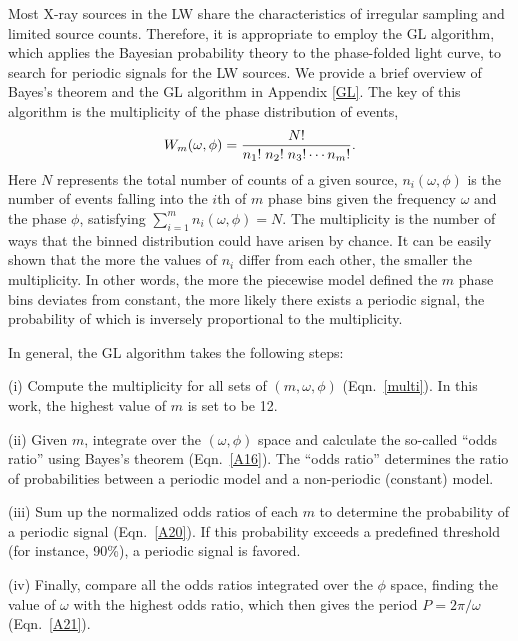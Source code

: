 \documentclass[fleqn,usenatbib]{mnras}
\begin{document}
Most X-ray sources in the LW share the characteristics of irregular sampling and limited source counts. 
Therefore, it is appropriate to employ the GL algorithm, which applies the Bayesian probability theory to the phase-folded light curve, to search for periodic signals for the LW sources. We provide a brief overview of Bayes's theorem and the GL algorithm in Appendix \ref{GL}. 
The key of this algorithm is the multiplicity of the phase distribution of events,
\begin{equation}\label{multi}
W_m(\omega, \phi)={{N!}\over{n_1!\; n_2!\; n_3!\cdots {n_m}!}}.
\end{equation}
Here $N$ represents the total number of counts of a given source, 
$n_i(\omega, \phi)$ is the number of events falling into the $i$th of $m$ phase bins given the frequency $\omega$ and the phase $\phi$, satisfying $\sum\limits_{i=1}^{m}n_i(\omega, \phi)=N$. 
The multiplicity is the number of ways that the binned distribution could have arisen by chance. It can be easily shown that the more the values of $n_i$ differ from each other, the smaller the multiplicity. In other words, the more the piecewise model defined the $m$ phase bins deviates from constant, the more likely there exists a periodic signal, the probability of which is inversely proportional to the multiplicity.  

In general, the GL algorithm takes the following steps:

(i) Compute the multiplicity for all sets of $(m,\omega, \phi)$ (Eqn.~\ref{multi}). In this work, the highest value of $m$ is set to be 12.

(ii) Given $m$, integrate over the $(\omega, \phi)$ space and calculate the so-called ``odds ratio'' using Bayes's theorem (Eqn.~\ref{A16}). The ``odds ratio'' determines the ratio of probabilities between a periodic model and a non-periodic (constant) model.

(iii) Sum up the normalized odds ratios of each $m$ to determine the probability of a periodic signal (Eqn.~\ref{A20}).
If this probability exceeds a predefined threshold (for instance, 90\%), a periodic signal is favored. 

(iv) Finally, compare all the odds ratios integrated over the $\phi$ space, finding the value of $\omega$ with the highest odds ratio, which then gives the period $P=2{\pi}/\omega$ (Eqn.~\ref{A21}).

\end{document}

